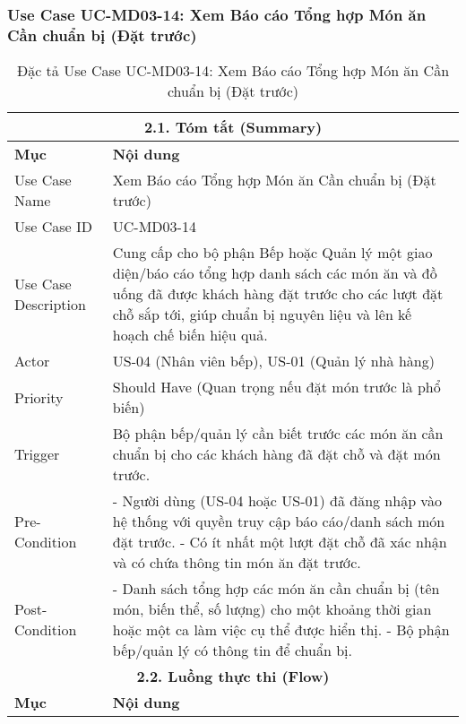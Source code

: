\subsubsection{Use Case UC-MD03-14: Xem Báo cáo Tổng hợp Món ăn Cần chuẩn bị (Đặt trước)}
\begin{longtable}{|m{4cm}|p{11cm}|}
\caption{Đặc tả Use Case UC-MD03-14: Xem Báo cáo Tổng hợp Món ăn Cần chuẩn bị (Đặt trước)} \label{tab:uc_md03_14_revised_v3} \\
\hline
\multicolumn{2}{|c|}{\textbf{2.1. Tóm tắt (Summary)}} \\
\hline
\textbf{Mục} & \textbf{Nội dung} \\
\hline
\endhead %
\hline
\endfoot %
\hline
\endlastfoot %
Use Case Name & Xem Báo cáo Tổng hợp Món ăn Cần chuẩn bị (Đặt trước) \\
\hline
Use Case ID & UC-MD03-14 \\
\hline
Use Case Description & Cung cấp cho bộ phận Bếp hoặc Quản lý một giao diện/báo cáo tổng hợp danh sách các món ăn và đồ uống đã được khách hàng đặt trước cho các lượt đặt chỗ sắp tới, giúp chuẩn bị nguyên liệu và lên kế hoạch chế biến hiệu quả. \\
\hline
Actor & US-04 (Nhân viên bếp), US-01 (Quản lý nhà hàng) \\
\hline
Priority & Should Have (Quan trọng nếu đặt món trước là phổ biến) \\
\hline
Trigger & Bộ phận bếp/quản lý cần biết trước các món ăn cần chuẩn bị cho các khách hàng đã đặt chỗ và đặt món trước. \\
\hline
Pre-Condition & - Người dùng (US-04 hoặc US-01) đã đăng nhập vào hệ thống với quyền truy cập báo cáo/danh sách món đặt trước. \newline - Có ít nhất một lượt đặt chỗ đã xác nhận và có chứa thông tin món ăn đặt trước. \\
\hline
Post-Condition & - Danh sách tổng hợp các món ăn cần chuẩn bị (tên món, biến thể, số lượng) cho một khoảng thời gian hoặc một ca làm việc cụ thể được hiển thị. \newline - Bộ phận bếp/quản lý có thông tin để chuẩn bị. \\
\hline
\multicolumn{2}{|c|}{\textbf{2.2. Luồng thực thi (Flow)}} \\
\hline
\textbf{Mục} & \textbf{Nội dung} \\
\hline

\end{longtable}
